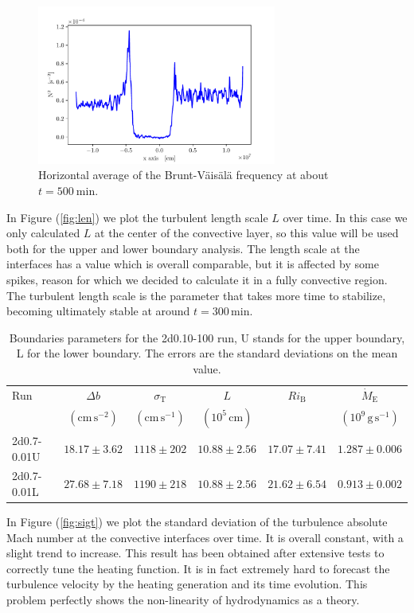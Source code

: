 \begin{figure}[t!]
\centering
\includegraphics[width=0.7\textwidth]{./img/brunt}
\caption{Horizontal average of the Brunt-Väisälä frequency at about $t=500 \ \mathrm{min}$.}
\label{fig:brunt}
\end{figure}
In Figure (\ref{fig:len}) we plot the turbulent length scale $L$ over time. In this case we only calculated $L$ at the center of the convective layer, so this value will be used both for the upper and lower boundary analysis. The length scale at the interfaces has a value which is overall comparable, but it is affected by some spikes, reason for which we decided to calculate it in a fully convective region. The turbulent length scale is the parameter that takes more time to stabilize, becoming ultimately stable at around $t = 300 \, \mathrm{min}$. 
 
\begin{table}[b!]\caption{Boundaries parameters for the 2d0.10-100 run, U stands for the upper boundary, L for the lower boundary. The errors are the standard deviations on the mean value.}
 \begin{tabular}{lccccc}
	 \toprule
	 Run &$\Delta b  $&$\sigma_{\mathrm{T}}$ & $L$&$Ri_{\mathrm{B}}$&$\dot{M}_{\mathrm{E}}$ \\
		    & $(\mathrm{cm \, s^{-2}})$&$(\mathrm{cm \, s^{-1}})$&$(10^5 \, \mathrm{cm})$ & & $(10^9 \, \mathrm{g \, s^{-1}})$ \\
	  	\midrule
		2d0.7-0.01U&$ 18.17 \pm 3.62 $&$1118 \pm 202 $ &  $10.88 \pm 2.56 $ & $17.07 \pm 7.41 $ & $1.287 \pm 0.006$\\
		2d0.7-0.01L &$27.68 \pm 7.18$&$1190 \pm 218$ & $10.88 \pm 2.56$ &  $21.62 \pm 6.54$ & $0.913 \pm 0.002$\\
		\bottomrule
	\end{tabular}\label{2dsingletab}
 \end{table}
In Figure (\ref{fig:sigt}) we plot the standard deviation of the turbulence absolute Mach number at the convective interfaces over time. It is overall constant, with a slight trend to increase. This result has been obtained after extensive tests to correctly tune the heating function. It is in fact extremely hard to forecast the turbulence velocity by the heating generation and its time evolution. This problem perfectly shows the non-linearity of hydrodynamics as a theory.

